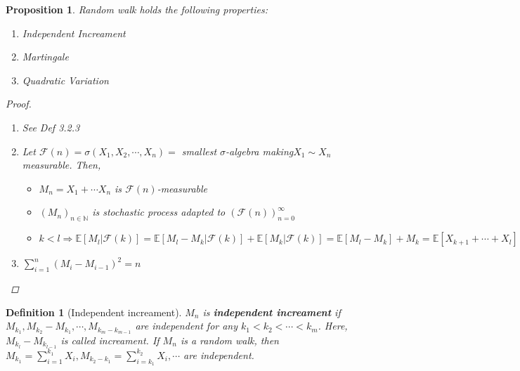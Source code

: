 \documentclass[12pt]{report}
\newcommand{\F}{\mathcal{F}}
\newcommand{\E}{\mathbb{E}}
\renewcommand{\1}{\mathbb{1}}
\theoremstyle{break}
\theoremstyle{newdef}
\newtheorem{defn}[thm]{Definition} %
\newtheorem{pro}[thm]{Proposition}
\theoremstyle{remark}
\begin{document}
\begin{pro}
Random walk holds the following properties:
\begin{enumerate}
\item Independent Increament
\item Martingale
\item Quadratic Variation
\end{enumerate}

\begin{proof}
\leavevmode
\begin{enumerate}
\item See Def 3.2.3
\item Let $\F(n) = \sigma(X_1, X_2, \cdots, X_n) = $ smallest $\sigma$-algebra making$X_1 \sim X_n$ measurable.
Then,
\begin{itemize}
\item $M_n = X_1 + \cdots X_n$ is $\F(n)$-measurable
\item $(M_n)_{n\in\mathbb{N}}$ is stochastic process adapted to $(\F(n))_{n=0}^\infty$
\item $k < l \Rightarrow
\E[M_l | \F(k)] = \E[M_l - M_k | \F(k)] + \E[M_k | \F(k)]
= \E[M_l - M_k] + M_k
= \E[X_{k+1} + \cdots + X_l] + M_k
= \E[X_{k+1}] + \cdots + \E[X_l] + M_k
= M_k.$
\end{itemize}

\item $\sum_{i=1}^n (M_i - M_{i-1})^2 = n$
\end{enumerate}
\end{proof}
\end{pro}

\begin{defn}[Independent increament]
$M_n$ is \textbf{independent increament} if
$M_{k_1}, M_{k_2}-M_{k_1}, \cdots, M_{k_m - k_{m-1}}$ are independent
for any $k_1 < k_2 < \cdots < k_m$.
Here, $M_{k_l} - M_{k_{l-1}}$ is called increament.
If $M_n$ is a random walk, then $M_{k_1} = \sum_{i=1}^{k_1} X_i, M_{k_2-k_1} = \sum_{i=k_1}^{k_2}X_i, \cdots$ are independent.
\end{defn}
\end{document}
